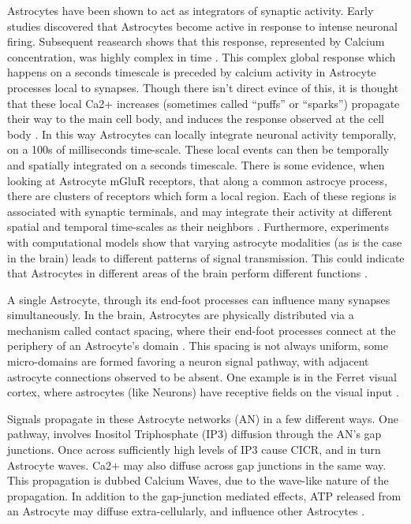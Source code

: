     Astrocytes have been shown to act as integrators of synaptic activity. Early
    studies discovered that Astrocytes become active in response to intense
    neuronal firing. Subsequent reasearch shows that this response, represented
    by Calcium concentration, was highly complex in time
    \cite{araque_2014}. This complex global response which happens on a seconds
    timescale is preceded by calcium activity in Astrocyte processes local to
    synapses. Though there isn't direct evince of this, it is thought that these
    local Ca2+ increases (sometimes called ``puffs'' or ``sparks'') propagate
    their way to the main cell body, and induces the response observed at the
    cell body \cite{araque_2014}. In this way Astrocytes can locally integrate
    neuronal activity temporally, on a 100s of milliseconds time-scale. These
    local events can then be temporally and spatially integrated on a seconds
    timescale. There is some evidence, when looking at Astrocyte mGluR
    receptors, that along a common astrocye process, there are clusters of
    receptors which form a local region. Each of these regions is associated
    with synaptic terminals, and may integrate their activity at different
    spatial and temporal time-scales as their neighbors
    \cite{pitta_2012}. Furthermore, experiments with computational models show
    that varying astrocyte modalities (as is the case in the brain) leads to
    different patterns of signal transmission. This could indicate that
    Astrocytes in different areas of the brain perform different functions
    \cite{pitta_2012}.

    A single Astrocyte, through its end-foot processes can influence many
    synapses simultaneously. In the brain, Astrocytes are physically distributed
    via a mechanism called contact spacing, where their end-foot processes
    connect at the periphery of an Astrocyte's domain \cite{pitta_2012}. This
    spacing is not always uniform, some micro-domains are formed favoring a
    neuron signal pathway, with adjacent astrocyte connections observed to be
    absent. One example is in the Ferret visual cortex, where astrocytes (like
    Neurons) have receptive fields on the visual input \cite{pitta_2012}.

    Signals propagate in these Astrocyte networks (AN) in a few different
    ways. One pathway, involves Inositol Triphosphate (IP3) diffusion through
    the AN's gap junctions. Once across sufficiently high levels of IP3 cause
    CICR, and in turn Astrocyte waves. Ca2+ may also diffuse across gap
    junctions in the same way. This propagation is dubbed Calcium Waves, due to
    the wave-like nature of the propagation. In addition to the gap-junction
    mediated effects, ATP released from an Astrocyte may diffuse
    extra-cellularly, and influence other Astrocytes \cite{amiri_2013}.

